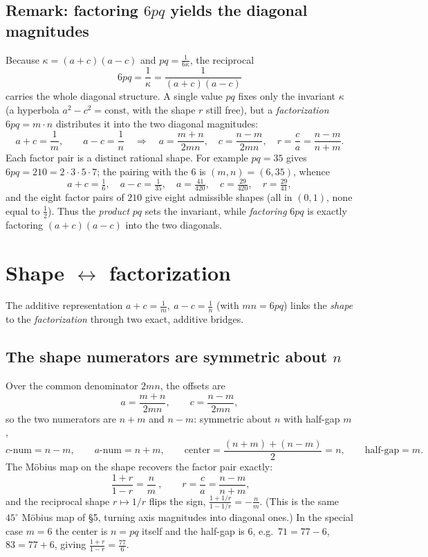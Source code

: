\documentclass[11pt]{article}
\begin{document}
\subsection*{Remark: factoring $6pq$ yields the diagonal magnitudes}

Because $\kappa=(a+c)(a-c)$ and $pq=\tfrac{1}{6\kappa}$, the reciprocal
\[
6pq=\frac{1}{\kappa}=\frac{1}{(a+c)(a-c)}
\]
carries the whole diagonal structure. A single value $pq$ fixes only the invariant
$\kappa$ (a hyperbola $a^2-c^2=\text{const}$, with the shape $r$ still free), but a
\emph{factorization} $6pq=m\cdot n$ distributes it into the two diagonal
magnitudes:
\[
a+c=\frac1m,\qquad a-c=\frac1n
\quad\Longrightarrow\quad
a=\frac{m+n}{2mn},\quad c=\frac{n-m}{2mn},\quad r=\frac{c}{a}=\frac{n-m}{n+m}.
\]
Each factor pair is a distinct rational shape. For example $pq=35$ gives
$6pq=210=2\cdot3\cdot5\cdot7$; the pairing with the $6$ is $(m,n)=(6,35)$, whence
\[
a+c=\tfrac16,\quad a-c=\tfrac1{35},\quad a=\tfrac{41}{420},\quad c=\tfrac{29}{420},
\quad r=\tfrac{29}{41},
\]
and the eight factor pairs of $210$ give eight admissible shapes (all in $(0,1)$,
none equal to $\tfrac12$). Thus the \emph{product} $pq$ sets the invariant, while
\emph{factoring} $6pq$ is exactly factoring $(a+c)(a-c)$ into the two diagonals.

\section{Shape $\leftrightarrow$ factorization}

The additive representation $a+c=\tfrac1m,\ a-c=\tfrac1n$ (with $mn=6pq$) links the
\emph{shape} to the \emph{factorization} through two exact, additive bridges.

\subsection*{The shape numerators are symmetric about $n$}

Over the common denominator $2mn$, the offsets are
\[
a=\frac{m+n}{2mn},\qquad c=\frac{n-m}{2mn},
\]
so the two numerators are $n+m$ and $n-m$: symmetric about $n$ with half-gap $m$,
\[
c\text{-num}=n-m,\qquad a\text{-num}=n+m,\qquad
\text{center}=\frac{(n+m)+(n-m)}{2}=n,\qquad \text{half-gap}=m.
\]
The Möbius map on the shape recovers the factor pair exactly:
\[
\boxed{\ \frac{1+r}{1-r}=\frac{n}{m}\ },\qquad r=\frac{c}{a}=\frac{n-m}{n+m},
\]
and the reciprocal shape $r\mapsto1/r$ flips the sign, $\tfrac{1+1/r}{1-1/r}=-\tfrac nm$.
(This is the same $45^\circ$ Möbius map of \S5, turning axis magnitudes into
diagonal ones.) In the special case $m=6$ the center is $n=pq$ itself and the
half-gap is $6$, e.g.\ $71=77-6$, $83=77+6$, giving $\tfrac{1+r}{1-r}=\tfrac{77}{6}$.
\end{document}
